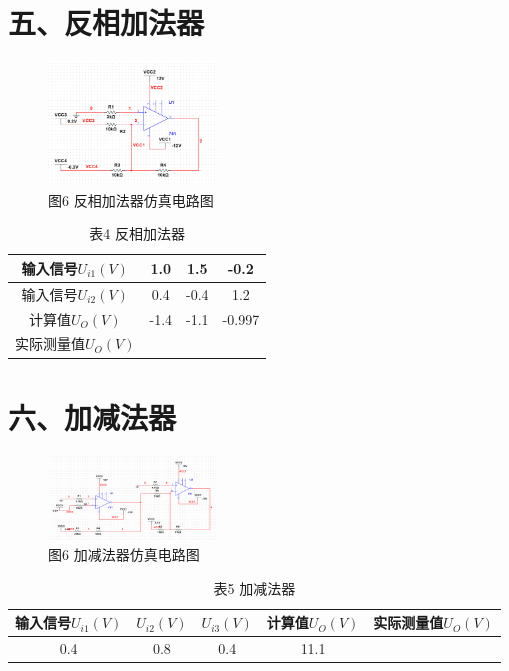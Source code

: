 \documentclass[a4paper,10pt,notitlepage]{article}
\begin{document}
	\section*{五、反相加法器}
	\begin{figure}[h]
		\centering
		\includegraphics[width=0.4\textwidth]{8.png}
		\caption*{图6 反相加法器仿真电路图}
	\end{figure}
	\newpage
	\begin{table}[h]
	\centering
	\begin{tabular}{|c|c|c|c|}
		\hline
		输入信号$U_{i1}(V)$ & 1.0 & 1.5 & -0.2 \\
		\hline
		输入信号$U_{i2}(V)$ & 0.4 & -0.4 & 1.2 \\
		\hline
		计算值$U_O(V)$ & -1.4 & -1.1 & -0.997 \\
		\hline
		实际测量值$U_O(V)$ & \qquad & \qquad & \qquad \\
		\hline
	\end{tabular}
	\caption*{表4 反相加法器}
	\end{table}
	\section*{六、加减法器}
	\begin{figure}[h]
		\centering
		\includegraphics[width=0.4\textwidth]{9.png}
		\caption*{图6 加减法器仿真电路图}
	\end{figure}
	\begin{table}[h]
		\centering
		\begin{tabular}{|c|c|c|c|c|}
			\hline
			输入信号$U_{i1}(V)$ & $U_{i2}(V)$ & $U_{i3}(V)$ & 计算值$U_O(V)$ & 实际测量值$U_O(V)$ \\
			\hline
			0.4 & 0.8 & 0.4 & 11.1 & \qquad \\
			\hline
		\end{tabular}
		\caption*{表5 加减法器}
	\end{table}
\end{document}

